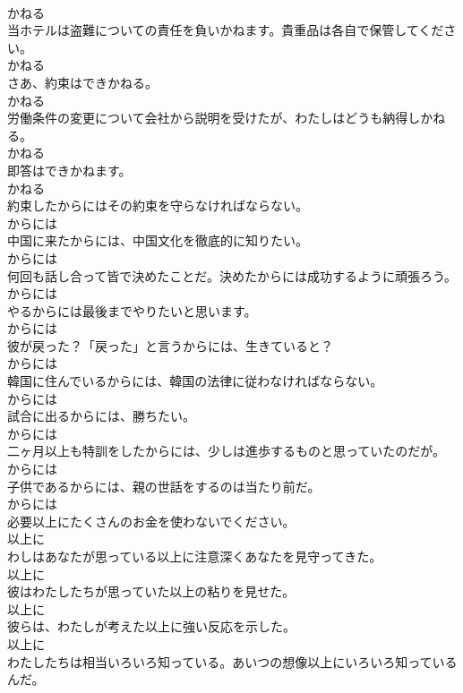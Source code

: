 \documentclass[8pt]{extreport}
\begin{document}
\begin{CJK}{UTF8}{min}
\\	かねる
\\	当ホテルは盗難についての責任を負いかねます。貴重品は各自で保管してください。	
\\	かねる
\\	さあ、約束はできかねる。	
\\	かねる
\\	労働条件の変更について会社から説明を受けたが、わたしはどうも納得しかねる。	
\\	かねる
\\	即答はできかねます。	
\\	かねる
\\	約束したからにはその約束を守らなければならない。	
\\	からには
\\	中国に来たからには、中国文化を徹底的に知りたい。	
\\	からには
\\	何回も話し合って皆で決めたことだ。決めたからには成功するように頑張ろう。	
\\	からには
\\	やるからには最後までやりたいと思います。	
\\	からには
\\	彼が戻った？「戻った」と言うからには、生きていると？	
\\	からには
\\	韓国に住んでいるからには、韓国の法律に従わなければならない。	
\\	からには
\\	試合に出るからには、勝ちたい。	
\\	からには
\\	二ヶ月以上も特訓をしたからには、少しは進歩するものと思っていたのだが。	
\\	からには
\\	子供であるからには、親の世話をするのは当たり前だ。	
\\	からには
\\	必要以上にたくさんのお金を使わないでください。	
\\	以上に
\\	わしはあなたが思っている以上に注意深くあなたを見守ってきた。	
\\	以上に
\\	彼はわたしたちが思っていた以上の粘りを見せた。	
\\	以上に
\\	彼らは、わたしが考えた以上に強い反応を示した。	
\\	以上に
\\	わたしたちは相当いろいろ知っている。あいつの想像以上にいろいろ知っているんだ。	

\end{CJK}
\end{document}
